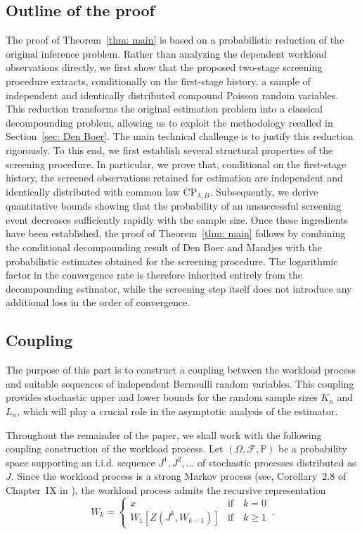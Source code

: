\documentclass[12pt]{article}
\newcommand{\1}{\mathbf{1}}
\begin{document}
\subsection{Outline of the proof} The proof of Theorem~\ref{thm: main} is based on a probabilistic reduction of the original inference problem. Rather than analyzing the dependent workload observations directly, we first show that the proposed two-stage screening procedure extracts, conditionally on the first-stage history, a sample of independent and identically distributed compound Poisson random variables. This reduction transforms the original estimation problem into a classical decompounding problem, allowing us to exploit the methodology recalled in Section~\ref{sec: Den Boer}. The main technical challenge is to justify this reduction rigorously. To this end, we first establish several structural properties of the screening procedure. In particular, we prove that, conditional on the first-stage history, the screened observations retained for estimation are independent and identically distributed with common law $\mathrm{CP}_{\lambda,B}$. Subsequently, we derive quantitative bounds showing that the probability of an unsuccessful screening event decreases sufficiently rapidly with the sample size. Once these ingredients have been established, the proof of Theorem~\ref{thm: main} follows by combining the conditional decompounding result of Den Boer and Mandjes with the probabilistic estimates obtained for the screening procedure. The logarithmic factor in the convergence rate is therefore inherited entirely from the decompounding estimator, while the screening step itself does not introduce any additional loss in the order of convergence.

\subsection{Coupling}
The purpose of this part is to construct a coupling between the workload process and suitable sequences of independent Bernoulli random variables. This coupling provides stochastic upper and lower bounds for the random sample sizes $K_n$ and $L_n$, which will play a crucial role in the asymptotic analysis of the estimator.

Throughout the remainder of the paper, we shall work with the following coupling construction of the workload process. Let
$(\Omega,\mathcal F,\mathbb P)$
be a probability space supporting an i.i.d. sequence
$J^1,J^2,\ldots$
of stochastic processes distributed as $J$.
Since the workload process is a strong Markov process (see, Corollary~2.8 of Chapter~IX in \cite{Asmussen2003}), the workload process admits the recursive representation
\begin{equation}\label{eq: recursion}
W_k
=\begin{cases}
    x & \text{if}\quad k=0 \\
    W_1\!\left[Z(J^k,W_{k-1})\right]  & \text{if}\quad k\geq1
\end{cases}\,.
\end{equation}
\end{document}
